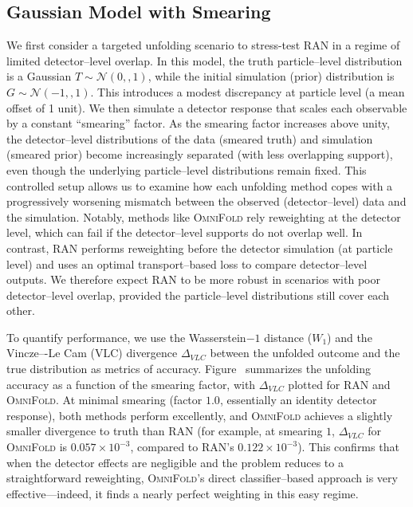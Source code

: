     \subsection{Gaussian Model with Smearing}
        We first consider a targeted unfolding scenario to stress-test RAN in a regime of limited detector--level overlap.
        In this model, the truth particle--level distribution is a Gaussian $T \sim \mathcal{N}(0,,1)$, while the initial simulation (prior) distribution is $G \sim \mathcal{N}(-1,,1)$.
        This introduces a modest discrepancy at particle level (a mean offset of 1 unit).
        We then simulate a detector response that scales each observable by a constant “smearing” factor.
        As the smearing factor increases above unity, the detector--level distributions of the data (smeared truth) and simulation (smeared prior) become increasingly separated (with less overlapping support), even though the underlying particle--level distributions remain fixed.
        This controlled setup allows us to examine how each unfolding method copes with a progressively worsening mismatch between the observed (detector--level) data and the simulation.
        Notably, methods like \textsc{OmniFold} rely reweighting at the detector level, which can fail if the detector--level supports do not overlap well.
        In contrast, RAN performs reweighting before the detector simulation (at particle level) and uses an optimal transport--based loss to compare detector--level outputs.
        We therefore expect RAN to be more robust in scenarios with poor detector--level overlap, provided the particle--level distributions still cover each other.

        To quantify performance, we use the Wasserstein\(-1\) distance ($W_1$) and the Vincze–-Le Cam (VLC) divergence $\Delta_{VLC}$ between the unfolded outcome and the true distribution as metrics of accuracy.
        Figure~ summarizes the unfolding accuracy as a function of the smearing factor, with $\Delta_{VLC}$ plotted for RAN and \textsc{OmniFold}.
        At minimal smearing (factor $1.0$, essentially an identity detector response), both methods perform excellently, and \textsc{OmniFold} achieves a slightly smaller divergence to truth than RAN (for example, at smearing $1$, $\Delta_{VLC}$ for \textsc{OmniFold} is $0.057\times10^{-3}$, compared to RAN’s $0.122\times10^{-3}$).
        This confirms that when the detector effects are negligible and the problem reduces to a straightforward reweighting, \textsc{OmniFold}’s direct classifier--based approach is very effective---indeed, it finds a nearly perfect weighting in this easy regime.

